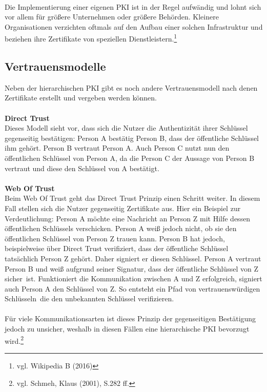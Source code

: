 \\
Die Implementierung einer eigenen PKI ist in der Regel aufwändig und lohnt sich vor allem für größere Unternehmen oder größere Behörden. Kleinere Organisationen verzichten oftmals auf den Aufbau einer solchen Infrastruktur und beziehen ihre Zertifikate von speziellen Dienstleistern.\footnote{vgl. Wikipedia B (2016)}
\subsection{Vertrauensmodelle}
\label{sec:Vertrauensmodelle}
Neben der hierarchischen PKI gibt es noch andere Vertrauensmodell nach denen Zertifikate erstellt und vergeben werden können.\\
\\
\textbf{Direct Trust}\\
Dieses Modell sieht vor, dass sich die Nutzer die Authentizität ihrer Schlüssel gegenseitig bestätigen: Person A bestätig Person B, dass der öffentliche Schlüssel ihm gehört. Person B vertraut Person A. Auch Person C nutzt nun den öffentlichen Schlüssel von Person A, da die Person C der Aussage von Person B vertraut und diese den Schlüssel von A bestätigt.\\
\\
\textbf{Web Of Trust}\\
Beim Web Of Trust geht das Direct Trust Prinzip einen Schritt weiter. In diesem Fall stellen sich die Nutzer gegenseitig Zertifikate aus. Hier ein Beispiel zur Verdeutlichung: Person A möchte eine Nachricht an Person Z mit Hilfe dessen öffentlichen Schlüssels verschicken. Person A weiß jedoch nicht, ob sie den öffentlichen Schlüssel von Person Z trauen kann. Person B hat jedoch, beispielweise über Direct Trust verifiziert, dass der öffentliche Schlüssel tatsächlich Person Z gehört. Daher signiert er diesen Schlüssel. Person A vertraut Person B und weiß aufgrund seiner Signatur, dass der öffentliche Schlüssel von Z \glqq sicher\grqq~ist. Funktioniert die Kommunikation zwischen A und Z erfolgreich, signiert auch Person A den Schlüssel von Z. So entsteht ein Pfad von \glqq vertrauenswürdigen Schlüsseln\grqq~die den unbekannten Schlüssel verifizieren.\\
\\
Für viele Kommunikationsarten ist dieses Prinzip der gegenseitigen Bestätigung jedoch zu unsicher, weshalb in diesen Fällen eine hierarchische PKI bevorzugt wird.\footnote{vgl. Schmeh, Klaus (2001), S.282 ff.}
